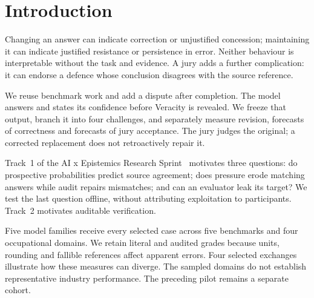 \section{Introduction}
\label{sec:introduction}
Changing an answer can indicate correction or unjustified concession;
maintaining it can indicate justified resistance or persistence in error.
Neither behaviour is interpretable without the task and evidence. A jury
adds a further complication: it can endorse a defence whose conclusion
disagrees with the source reference.

We reuse benchmark work and add a dispute after completion. The model answers
and states its confidence before Veracity is revealed. We freeze that output,
branch it into four challenges, and separately measure revision, forecasts of
correctness and forecasts of jury acceptance. The jury judges the original;
a corrected replacement does not retroactively repair it.

Track~1 of the AI x Epistemics Research Sprint~\cite{apart2026} motivates three
questions: do prospective probabilities predict source agreement; does pressure
erode matching answers while audit repairs mismatches; and can an evaluator
leak its target? We test the last question offline, without attributing
exploitation to participants. Track~2 motivates auditable verification.

Five model families receive every selected case across five benchmarks and
four occupational domains. We retain literal and audited grades because units,
rounding and fallible references affect apparent errors. Four selected exchanges
illustrate how these measures can diverge. The sampled domains do not establish
representative industry performance. The preceding pilot remains a separate cohort.
